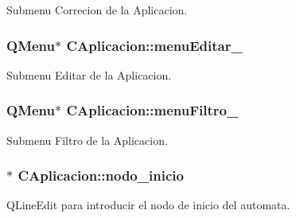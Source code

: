 Submenu Correcion de la Aplicacion. 

\subsubsection[{\texorpdfstring{menu\+Editar\+\_\+}{menuEditar_}}]{\setlength{\rightskip}{0pt plus 5cm}Q\+Menu$\ast$ C\+Aplicacion\+::menu\+Editar\+\_\+\hspace{0.3cm}{\ttfamily [private]}}\hypertarget{classCAplicacion_a9753ee6650d3a8922650b09b70fe15b9}{}\label{classCAplicacion_a9753ee6650d3a8922650b09b70fe15b9}


Submenu Editar de la Aplicacion. 

\subsubsection[{\texorpdfstring{menu\+Filtro\+\_\+}{menuFiltro_}}]{\setlength{\rightskip}{0pt plus 5cm}Q\+Menu$\ast$ C\+Aplicacion\+::menu\+Filtro\+\_\+\hspace{0.3cm}{\ttfamily [private]}}\hypertarget{classCAplicacion_af9dedeec60356a055cb899e5f8a447b8}{}\label{classCAplicacion_af9dedeec60356a055cb899e5f8a447b8}


Submenu Filtro de la Aplicacion. 

\subsubsection[{\texorpdfstring{nodo\+\_\+inicio}{nodo_inicio}}]{$\ast$ C\+Aplicacion\+::nodo\+\_\+inicio\hspace{0.3cm}{\ttfamily [private]}}\hypertarget{classCAplicacion_a9d3e345fc25efeaf8a160daf22206a8e}{}\label{classCAplicacion_a9d3e345fc25efeaf8a160daf22206a8e}


Q\+Line\+Edit para introducir el nodo de inicio del automata. 

